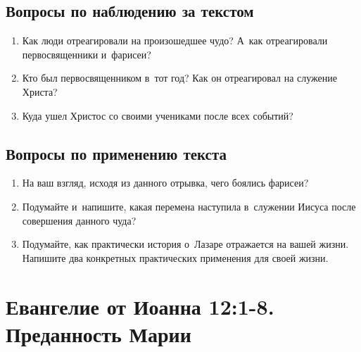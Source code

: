 \documentclass[a4paper,12pt]{article}
\begin{document}
\subsection*{Вопросы по наблюдению за текстом}
\begin{enumerate}
    \item Как люди отреагировали на произошедшее чудо? А~как отреагировали первосвященники и~фарисеи? 
    
    \myline
    
    \myline
    \item Кто был первосвященником в~тот год? Как он отреагировал на служение Христа? 
    
    \myline
    
    \myline
    \item Куда ушел Христос со своими учениками после всех событий? 
    
    \myline
    
    \myline
\end{enumerate}

\subsection*{Вопросы по применению текста} 
\begin{enumerate}
    \item На ваш взгляд, исходя из данного отрывка, чего боялись фарисеи? 
    
    \myline
    
    \myline
    \item Подумайте и~напишите, какая перемена наступила в~служении Иисуса после совершения данного чуда? 
    
    \myline
    
    \myline
    \item Подумайте, как практически история о~Лазаре отражается на вашей жизни. Напишите два конкретных практических применения для своей жизни. 
    
    \myline
    
    \myline
\end{enumerate}



\section{Евангелие от Иоанна 12:1-8. Преданность Марии}
\end{document}
